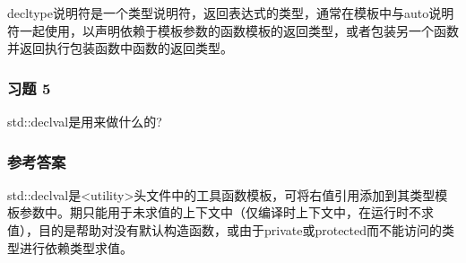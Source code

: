 decltype说明符是一个类型说明符，返回表达式的类型，通常在模板中与auto说明符一起使用，以声明依赖于模板参数的函数模板的返回类型，或者包装另一个函数并返回执行包装函数中函数的返回类型。

\subsubsection{习题 5}

std::declval是用来做什么的?

\subsubsection{参考答案}

std::declval是<utility>头文件中的工具函数模板，可将右值引用添加到其类型模板参数中。期只能用于未求值的上下文中（仅编译时上下文中，在运行时不求值），目的是帮助对没有默认构造函数，或由于private或protected而不能访问的类型进行依赖类型求值。












